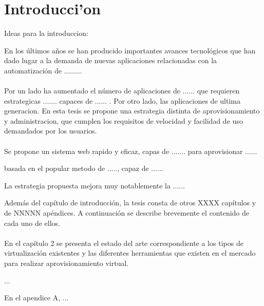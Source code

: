 \chapter{Introducci'on}

Ideas para la introduccion:

En los últimos años se han producido importantes avances tecnológicos que han dado lugar a la demanda de nuevas aplicaciones relacionadas con la automatización de .........\\
\\
Por un lado ha aumentado el número de aplicaciones de ...... que requieren estrategicas ....... capaces de ...... . Por otro lado, las aplicaciones  de ultima generacion. En esta tesis se propone una estrategia distinta de aprovisionamiento y administracion, que cumplen los requisitos de velocidad y facilidad de uso demandados por los usuarios.\\
\\
Se propone un sistema web rapido y eficaz, capas de ....... para aprovisionar ...... 

basada en el popular metodo de ....., capaz de ......

La estrategia propuesta mejora muy notablemente la ......

Además del capítulo de introducción, la tesis consta de otros XXXX capítulos y de NNNNN apéndices. A continuación se describe brevemente el contenido de cada uno de ellos.\\
\\
En el capítulo 2 se presenta el estado del arte correspondiente a los tipos de virtualización existentes y las diferentes herramientas que existen en el mercado para realizar aprovisionamiento virtual.

...

En el apendice A, ...

